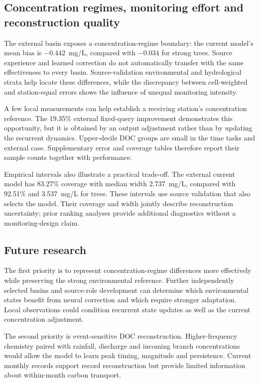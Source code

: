 \documentclass[11pt]{article}
\begin{document}
\subsection{Concentration regimes, monitoring effort and reconstruction quality}
The external basin exposes a concentration-regime boundary: the current model's mean bias is $-0.442$~mg/L, compared with $-0.034$ for strong trees. Source experience and learned correction do not automatically transfer with the same effectiveness to every basin. Source-validation environmental and hydrological strata help locate these differences, while the discrepancy between cell-weighted and station-equal errors shows the influence of unequal monitoring intensity.

A few local measurements can help establish a receiving station's concentration reference. The 19.35\% external fixed-query improvement demonstrates this opportunity, but it is obtained by an output adjustment rather than by updating the recurrent dynamics. Upper-decile DOC groups are small in the time tasks and external case. Supplementary error and coverage tables therefore report their sample counts together with performance.

Empirical intervals also illustrate a practical trade-off. The external current model has 83.27\% coverage with median width 2.737~mg/L, compared with 92.51\% and 3.537~mg/L for trees. These intervals use source validation that also selects the model. Their coverage and width jointly describe reconstruction uncertainty; prior ranking analyses provide additional diagnostics without a monitoring-design claim.

\subsection{Future research}
The first priority is to represent concentration-regime differences more effectively while preserving the strong environmental reference. Further independently selected basins and source-role development can determine which environmental states benefit from neural correction and which require stronger adaptation. Local observations could condition recurrent state updates as well as the current concentration adjustment.

The second priority is event-sensitive DOC reconstruction. Higher-frequency chemistry paired with rainfall, discharge and incoming branch concentrations would allow the model to learn peak timing, magnitude and persistence. Current monthly records support record reconstruction but provide limited information about within-month carbon transport.
\end{document}
